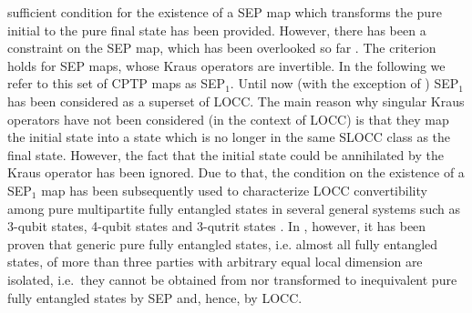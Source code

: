 \documentclass[superscriptaddress,twocolumn]{revtex4}\usepackage[utf8]{inputenc}
\begin{document}
sufficient condition for the existence of a SEP map which transforms the pure initial to the pure final state has been provided.
However, there has been a constraint on the SEP map, which has been overlooked so far \cite{erratumGoWa11}. The criterion holds for SEP maps, whose Kraus operators are invertible. In the following we refer to this set of CPTP maps as SEP$_1$. Until now (with the exception of \cite{GoKr17,SaGo18}) SEP$_1$ has been considered as a superset of LOCC. The main reason why singular Kraus operators have not been considered (in the context of LOCC) is that they map the initial state into a state which is no longer in the same SLOCC class as the final state. However, the fact that the initial state could be annihilated by the Kraus operator has been ignored. Due to that, the condition on the existence of a SEP$_1$ map has been subsequently used to characterize LOCC convertibility among pure multipartite fully entangled states in several general systems such as 3-qubit states, 4-qubit states and 3-qutrit states \cite{deSp13,SaSc15,SpdV16,HeSp16}. In \cite{GoKr17,SaGo18}, however, it has been proven that generic pure fully entangled states, i.e. almost all fully entangled states, of more than three parties with arbitrary equal local dimension are isolated, i.e.\ they cannot be obtained from nor transformed to inequivalent pure fully entangled states by SEP and, hence, by LOCC.
\end{document}
